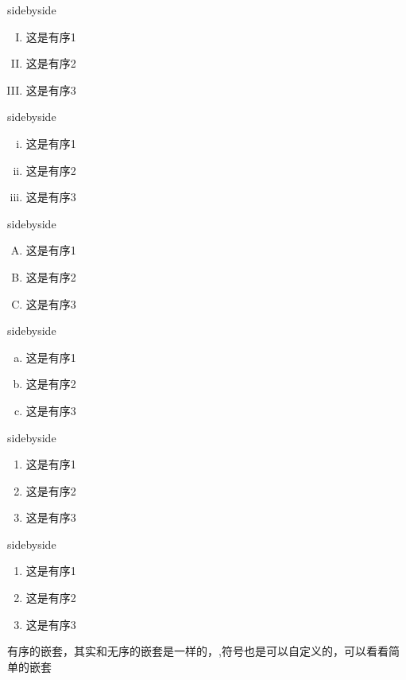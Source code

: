 \documentclass[cn,chinese,color=cyan]{elegantbook}
\begin{document}
\begin{tcblisting}{sidebyside}
\begin{enumerate}[(I)]
\item 这是有序1
\item 这是有序2
\item 这是有序3
\end{enumerate}
\end{tcblisting}
\begin{tcblisting}{sidebyside}
\begin{enumerate}[(i)]
\item 这是有序1
\item 这是有序2
\item 这是有序3
\end{enumerate}
\end{tcblisting}
\begin{tcblisting}{sidebyside}
\begin{enumerate}[(A)]
\item 这是有序1
\item 这是有序2
\item 这是有序3
\end{enumerate}
\end{tcblisting}
\begin{tcblisting}{sidebyside}
\begin{enumerate}[(a)]
\item 这是有序1
\item 这是有序2
\item 这是有序3
\end{enumerate}
\end{tcblisting}
\begin{tcblisting}{sidebyside}
\begin{enumerate}[{a}-1]
\item 这是有序1
\item 这是有序2
\item 这是有序3
\end{enumerate}
\end{tcblisting}
\begin{tcblisting}{sidebyside}
\begin{enumerate}[Ex i]
\item 这是有序1
\item 这是有序2
\item 这是有序3
\end{enumerate}
\end{tcblisting}
\begin{note}
	有序的嵌套，其实和无序的嵌套是一样的，,符号也是可以自定义的，可以看看简单的嵌套
\end{note}
\end{document}

